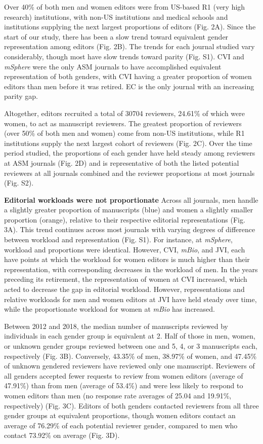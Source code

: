 \documentclass[11pt,]{article}
\begin{document}
Over 40\% of both men and women editors were from US-based R1 (very high
research) institutions, with non-US institutions and medical schools and
institutions supplying the next largest proportions of editors (Fig.
2A). Since the start of our study, there has been a slow trend toward
equivalent gender representation among editors (Fig. 2B). The trends for
each journal studied vary considerably, though most have slow trends
toward parity (Fig. S1). CVI and \emph{mSphere} were the only ASM
journals to have accomplished equivalent representation of both genders,
with CVI having a greater proportion of women editors than men before it
was retired. EC is the only journal with an increasing parity gap.

Altogether, editors recruited a total of 30704 reviewers, 24.61\% of
which were women, to act as manuscript reviewers. The greatest
proportion of reviewers (over 50\% of both men and women) come from
non-US institutions, while R1 institutions supply the next largest
cohort of reviewers (Fig. 2C). Over the time period studied, the
proportions of each gender have held steady among reviewers at ASM
journals (Fig. 2D) and is representative of both the listed potential
reviewers at all journals combined and the reviewer proportions at most
journals (Fig. S2).

\textbf{Editorial workloads were not proportionate} Across all journals,
men handle a slightly greater proportion of manuscripts (blue) and women
a slightly smaller proportion (orange), relative to their respective
editorial representations (Fig. 3A). This trend continues across most
journals with varying degrees of difference between workload and
representation (Fig. S1). For instance, at \emph{mSphere}, workload and
proportions were identical. However, CVI, \emph{mBio}, and JVI, each
have points at which the workload for women editors is much higher than
their representation, with corresponding decreases in the workload of
men. In the years preceding its retirement, the representation of women
at CVI increased, which acted to decrease the gap in editorial workload.
However, representations and relative workloads for men and women
editors at JVI have held steady over time, while the proportionate
workload for women at \emph{mBio} has increased.

Between 2012 and 2018, the median number of manuscripts reviewed by
individuals in each gender group is equivalent at 2. Half of those in
men, women, or unknown gender groups reviewed between one and 5, 4, or 3
manuscripts each, respectively (Fig. 3B). Conversely, 43.35\% of men,
38.97\% of women, and 47.45\% of unknown gendered reviewers have
reviewed only one manuscript. Reviewers of all genders accepted fewer
requests to review from women editors (average of 47.91\%) than from men
(average of 53.4\%) and were less likely to respond to women editors
than men (no response rate averages of 25.04 and 19.91\%, respectively)
(Fig. 3C). Editors of both genders contacted reviewers from all three
gender groups at equivalent proportions, though women editors contact an
average of 76.29\% of each potential reviewer gender, compared to men
who contact 73.92\% on average (Fig. 3D).
\end{document}
